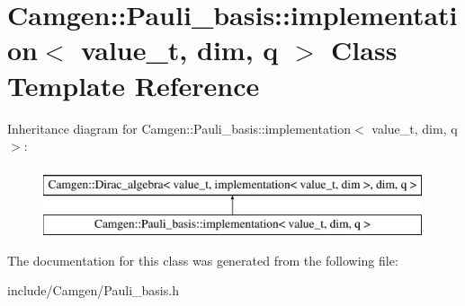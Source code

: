 \hypertarget{a00297}{}\section{Camgen\+:\+:Pauli\+\_\+basis\+:\+:implementation$<$ value\+\_\+t, dim, q $>$ Class Template Reference}
\label{a00297}
Inheritance diagram for Camgen\+:\+:Pauli\+\_\+basis\+:\+:implementation$<$ value\+\_\+t, dim, q $>$\+:\begin{figure}[H]
\begin{center}
\leavevmode
\includegraphics[height=2.000000cm]{a00297}
\end{center}
\end{figure}


The documentation for this class was generated from the following file\+:\begin{DoxyCompactItemize}
\item 
include/\+Camgen/Pauli\+\_\+basis.\+h\end{DoxyCompactItemize}
